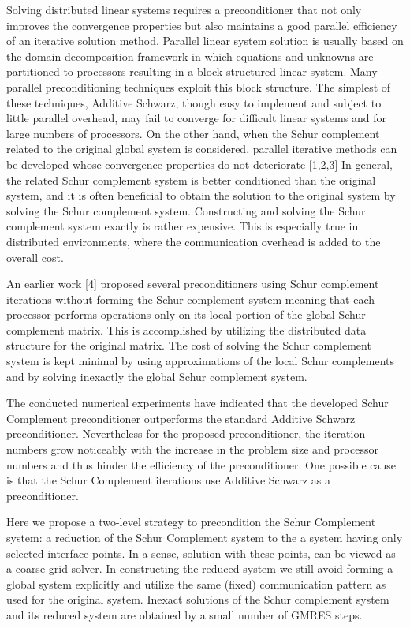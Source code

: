 \documentclass[11pt]{article}
\begin{document}
Solving distributed linear systems requires a preconditioner that not only
improves the convergence properties but also maintains a good parallel
efficiency
of an iterative solution method. Parallel linear system solution
is usually based on the domain decomposition framework in which equations
and unknowns are partitioned to processors resulting in a block-structured
linear system.
Many parallel preconditioning techniques exploit this block structure.
The simplest of these techniques, Additive Schwarz, though
easy to implement and subject to little parallel overhead, may fail to
converge for   difficult   linear systems and  for   large  numbers of
processors.  On the other  hand, when the  Schur complement related to
the  original global  system is  considered,  parallel iterative methods
can be developed whose convergence properties do not deteriorate [1,2,3]
In general, the related Schur  complement system  is  better conditioned
than  the original system, and it is often  beneficial to obtain the solution
to the   original system by solving the    Schur complement system.
Constructing and solving the Schur complement system exactly is rather
expensive.
This  is especially true   in
distributed environments, where the communication overhead is added to
the overall cost.

 An earlier work [4] proposed several preconditioners using
Schur complement iterations
without forming the Schur complement system meaning
that each  processor performs operations only on  its local portion of
the global Schur complement  matrix. This is accomplished by utilizing
the distributed data  structure for the  original matrix.  The cost of
solving the  Schur   complement   system  is kept  minimal   by  using
approximations of the local Schur complements and by solving inexactly
the  global Schur  complement system.

 The conducted numerical experiments have indicated
that the developed Schur Complement preconditioner
outperforms the standard Additive Schwarz preconditioner.
Nevertheless for the proposed
preconditioner, the iteration numbers grow noticeably with the increase in
the problem size and processor numbers and thus hinder the efficiency
of the preconditioner.  One possible cause is that
the Schur Complement iterations use Additive Schwarz as a preconditioner.

Here we propose a two-level strategy to precondition the Schur
Complement system:
a reduction of the Schur Complement system to the a system having only
selected interface
points. In a sense, solution with these points,  can be viewed as a
coarse grid solver.  In constructing the reduced system we
still avoid forming a global system  explicitly and utilize the same
(fixed) communication pattern as used for the original system.
Inexact solutions of the
Schur  complement system and its reduced system are obtained   by  a small
number  of  GMRES steps.
\end{document}
